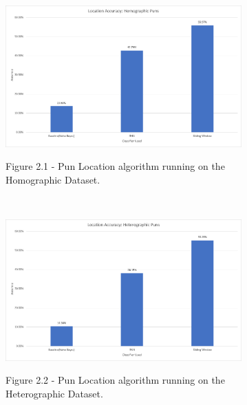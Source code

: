 \documentclass[final]{beamer}
\newlength{\onecolwid}
\newlength{\twocolwid}
\begin{document}
\begin{frame}[t]
\begin{columns}[t]
\begin{column}{\twocolwid}
\begin{columns}[t,totalwidth=\twocolwid]
\begin{column}{\onecolwid}
\end{column} %

\begin{column}{\onecolwid} %


\begin{figure}
\includegraphics[width=0.85\textwidth]{HomographicLocation.png}\\
\caption{Figure 2.1 - Pun Location algorithm running on the Homographic Dataset.}
\end{figure}
\\
\vspace{20mm}
\begin{figure}
\includegraphics[width=0.85\textwidth]{HeterographicLocation.png}\\
\caption{Figure 2.2 - Pun Location algorithm running on the Heterographic Dataset.}
\end{figure}



\end{column}
\end{columns}
\end{column}
\end{columns}
\end{frame}
\end{document}
